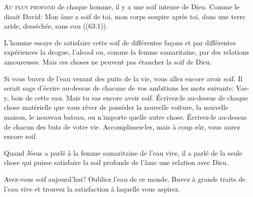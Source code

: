 



\lettrine{A}{u plus profond} de chaque homme,
 il y a une soif intense de Dieu.
 Comme le disait David: 
 \Og Mon âme a soif de toi, mon corps soupire après toi,
 dans une terre aride, desséchée, sans eau \Fg{}
 ((63:1)). 

L'homme essaye de satisfaire cette soif de différentes fa\c{c}ons
 et par différentes expériences \ocadr la drogue, l'alcool ou,
 comme la femme samaritaine, par des relations amoureuses.
 Mais ces choses ne peuvent pas étancher la soif de Dieu.


Si vous buvez de l'eau venant des puits de la vie,
 vous allez encore avoir soif.
 Il serait sage d'écrire au-dessus
 de chacune de vos ambitions les mots suivants:
 \Og Vas-y, bois de cette eau. Mais tu vas encore avoir soif. \Fg{}
 Écrivez-le  au-dessus de chaque chose matérielle
 que vous rêver de posséder \ocadr la nouvelle voiture, la nouvelle maison,
 le nouveau bateau, ou n'importe quelle autre chose.
 Écrivez-le au-dessus de chacun des buts de votre vie.
 Accomplissez-les, mais à coup sûr, vous aurez encore soif.

Quand Jésus a parlé à la femme samaritaine de l'eau vive,
 il a parlé de la seule chose qui puisse satisfaire
 la soif profonde de l'âme \ocadr une relation avec Dieu.

Avez-vous soif aujourd'hui? Oubliez l'eau de ce monde.
 Buvez à grands traits de l'eau vive et trouvez la satisfaction
 à laquelle vous aspirez.

\dvrule




